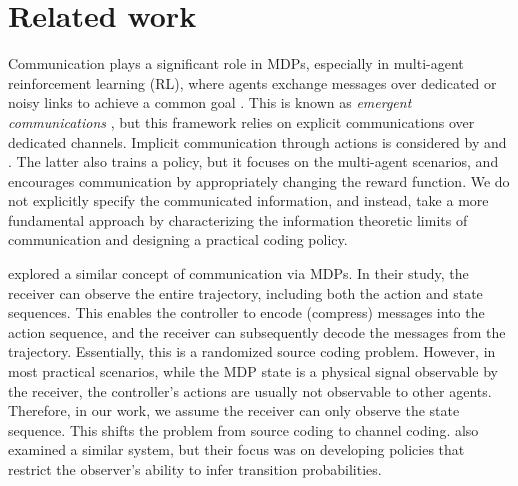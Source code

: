 \section{Related work}
Communication plays a significant role in MDPs, especially in multi-agent reinforcement learning (RL), where agents exchange messages over dedicated or noisy links  to achieve a common goal \citep{wang_learning_2020,chen2024rgmcomm,tung_effective_2021}. 
This is known as \textit{emergent communications} \citep{boldt2024a}, but this framework relies on explicit communications over dedicated channels.  Implicit communication through actions is considered by \cite{Knepper:HRI:17} and \cite{tian2019learningcommunicateimplicitlyactions}. The latter also trains a policy, but it focuses on the multi-agent scenarios, and encourages communication by appropriately changing the reward function. We do not explicitly specify the communicated information, and instead, take a more fundamental approach by characterizing the information theoretic limits of communication and designing a practical coding policy.

{\color{black} \cite{sokota2022communicating} explored a similar concept of communication via MDPs. In their study, the receiver can observe the entire trajectory, including both the action and state sequences. This enables the controller to encode (compress) messages into the action sequence, and the receiver can subsequently decode the messages from the trajectory. Essentially, this is a randomized source coding problem. However, in most practical scenarios, while the MDP state is a physical signal observable by the receiver, the controller’s actions are usually not observable to other agents. Therefore, in our work, we assume the receiver can only observe the state sequence. This shifts the problem from source coding to channel coding. \cite{Karabay2019} also examined a similar system, but their focus was on developing policies that restrict the observer’s ability to infer transition probabilities. }

